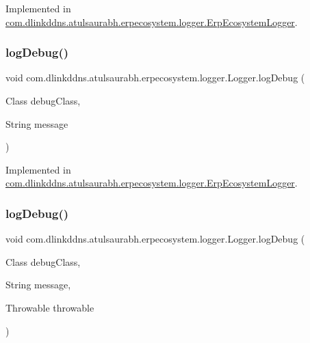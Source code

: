 Implemented in \mbox{\hyperlink{classcom_1_1dlinkddns_1_1atulsaurabh_1_1erpecosystem_1_1logger_1_1_erp_ecosystem_logger_a220bd030f8fe67c986972c3925727196}{com.\+dlinkddns.\+atulsaurabh.\+erpecosystem.\+logger.\+Erp\+Ecosystem\+Logger}}.

\mbox{\label{interfacecom_1_1dlinkddns_1_1atulsaurabh_1_1erpecosystem_1_1logger_1_1_logger_a8e94c010b6e08d96550a8ddc4b2f408e}} 
\subsubsection{\texorpdfstring{log\+Debug()}{logDebug()}\hspace{0.1cm}{\footnotesize\ttfamily [2/3]}}
{\footnotesize\ttfamily void com.\+dlinkddns.\+atulsaurabh.\+erpecosystem.\+logger.\+Logger.\+log\+Debug (\begin{DoxyParamCaption}\item[{Class}]{debug\+Class,  }\item[{String}]{message }\end{DoxyParamCaption})}



Implemented in \mbox{\hyperlink{classcom_1_1dlinkddns_1_1atulsaurabh_1_1erpecosystem_1_1logger_1_1_erp_ecosystem_logger_a80d54c08b8d233dc1782e1f85bdde19a}{com.\+dlinkddns.\+atulsaurabh.\+erpecosystem.\+logger.\+Erp\+Ecosystem\+Logger}}.

\mbox{\label{interfacecom_1_1dlinkddns_1_1atulsaurabh_1_1erpecosystem_1_1logger_1_1_logger_a95b44330997929adfe530e3c845e38f5}} 
\subsubsection{\texorpdfstring{log\+Debug()}{logDebug()}\hspace{0.1cm}{\footnotesize\ttfamily [3/3]}}
{\footnotesize\ttfamily void com.\+dlinkddns.\+atulsaurabh.\+erpecosystem.\+logger.\+Logger.\+log\+Debug (\begin{DoxyParamCaption}\item[{Class}]{debug\+Class,  }\item[{String}]{message,  }\item[{Throwable}]{throwable }\end{DoxyParamCaption})}



